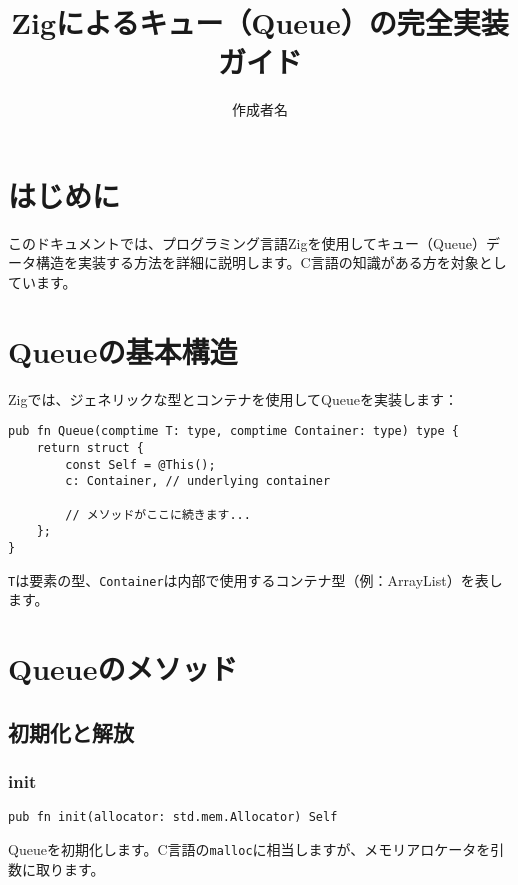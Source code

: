\documentclass{ltjsarticle}
\title{Zigによるキュー（Queue）の完全実装ガイド}
\author{作成者名}
\date{}
\begin{document}
\begin{titlingpage}
\maketitle
\end{titlingpage}

\newpage
\tableofcontents

\newpage

\section{はじめに}

このドキュメントでは、プログラミング言語Zigを使用してキュー（Queue）データ構造を実装する方法を詳細に説明します。C言語の知識がある方を対象としています。

\section{Queueの基本構造}

Zigでは、ジェネリックな型とコンテナを使用してQueueを実装します：

\begin{lstlisting}[style=zigstyle]
pub fn Queue(comptime T: type, comptime Container: type) type {
    return struct {
        const Self = @This();
        c: Container, // underlying container

        // メソッドがここに続きます...
    };
}
\end{lstlisting}

\texttt{T}は要素の型、\texttt{Container}は内部で使用するコンテナ型（例：ArrayList）を表します。

\section{Queueのメソッド}

\subsection{初期化と解放}

\subsubsection{init}
\begin{lstlisting}[style=zigstyle]
pub fn init(allocator: std.mem.Allocator) Self
\end{lstlisting}
Queueを初期化します。C言語の\texttt{malloc}に相当しますが、メモリアロケータを引数に取ります。
\end{document}
